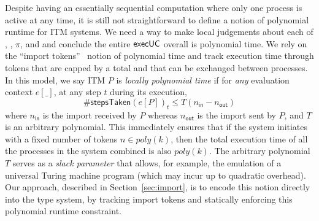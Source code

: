 Despite having an essentially sequential computation where only one process is active at any time,
it is still not straightforward to define a notion of polynomial runtime for ITM systems.
We need a way to make local judgements about each of \A, \Z, $\pi$, and \F and conclude the entire ${\mathsf {execUC}}$ overall is polynomial time. 
We rely on the ``import tokens''~\cite{canettiUC} notion of polynomial time and track execution time through tokens that
are capped by a total and that can be exchanged between processes. 
In this model, we say ITM $P$ is \emph{locally polynomial time} if for \emph{any} evaluation context $e[\_]$, at any step $t$ during its execution,
\[
\#\textsf{stepsTaken}(e[P])_{t} \le T(n_{\textsf{in}} - n_{\textsf{out}})
\]
where $n_{\textsf{in}}$ is the import received by $P$ whereas $n_{\textsf{out}}$ is the import sent by $P$, and $T$ is an arbitrary polynomial.
This immediately ensures that if the system initiates with a fixed number of tokens $n \in poly(k)$, then the total execution time
of all the processes in the system combined is also $poly(k)$.
The arbitrary polynomial $T$ serves as a \emph{slack parameter} that allows, for example,
the emulation of a universal Turing machine program (which may incur up to quadratic overhead).
Our approach, described in Section~\ref{sec:import}, is to encode this notion directly into the type system, by tracking import tokens and statically enforcing this polynomial runtime constraint.


